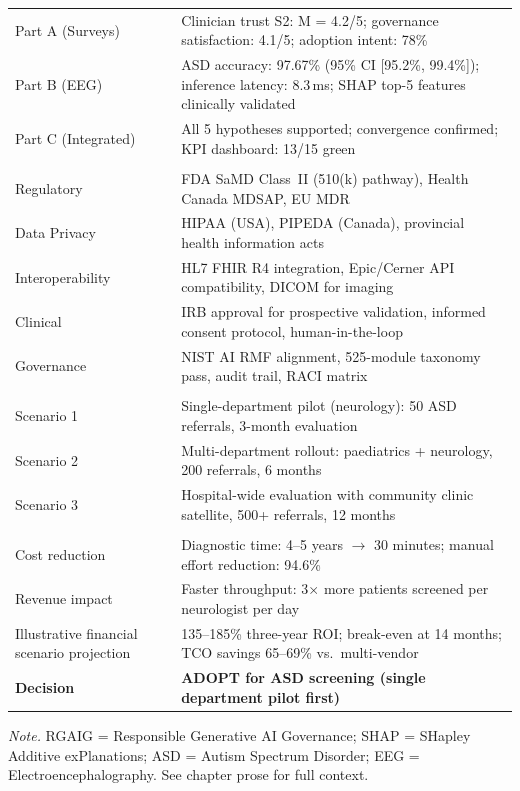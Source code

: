 {\begin{xltabular}{\textwidth}{@{} >{\raggedright\arraybackslash}p{2.5cm} L @{}}
\addlinespace
Part A (Surveys) & Clinician trust S2: M = 4.2/5; governance satisfaction: 4.1/5; adoption intent: 78\% \\
Part B (EEG) & ASD accuracy: 97.67\% (95\% CI [95.2\%, 99.4\%]); inference latency: 8.3\,ms; SHAP top-5 features clinically validated \\
Part C (Integrated) & All 5 hypotheses supported; convergence confirmed; KPI dashboard: 13/15 green \\
\midrule
{} \\
\addlinespace
Regulatory & FDA SaMD Class~II (510(k) pathway), Health Canada MDSAP, EU MDR \\
Data Privacy & HIPAA (USA), PIPEDA (Canada), provincial health information acts \\
Interoperability & HL7 FHIR R4 integration, Epic/Cerner API compatibility, DICOM for imaging \\
Clinical & IRB approval for prospective validation, informed consent protocol, human-in-the-loop \\
Governance & NIST AI RMF alignment, 525-module taxonomy pass, audit trail, RACI matrix \\
\midrule
{} \\
\addlinespace
Scenario 1 & Single-department pilot (neurology): 50 ASD referrals, 3-month evaluation \\
Scenario 2 & Multi-department rollout: paediatrics + neurology, 200 referrals, 6 months \\
Scenario 3 & Hospital-wide evaluation with community clinic satellite, 500+ referrals, 12 months \\
\midrule
{} \\
\addlinespace
Cost reduction & Diagnostic time: 4--5 years $\to$ 30 minutes; manual effort reduction: 94.6\% \\
Revenue impact & Faster throughput: 3$\times$ more patients screened per neurologist per day \\
Illustrative financial scenario projection & 135--185\% three-year ROI; break-even at 14 months; TCO savings 65--69\% vs.\ multi-vendor \\
\midrule
\textbf{Decision} & \textbf{ADOPT for ASD screening (single department pilot first)} \\
\end{xltabular}}
\vspace{0.3em}\noindent\textit{Note.} RGAIG = Responsible Generative AI Governance; SHAP = SHapley Additive exPlanations; ASD = Autism Spectrum Disorder; EEG = Electroencephalography. See chapter prose for full context.

